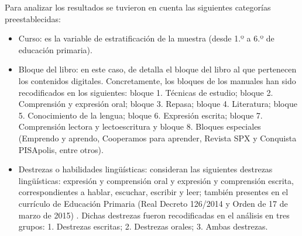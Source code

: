 \documentclass{textolivre}
\begin{document}
Para analizar los resultados se tuvieron en cuenta las siguientes categorías preestablecidas:  

\begin{itemize}
    \item Curso: es la variable de estratificación de la muestra (desde 1.º a 6.º de educación primaria).
    \item Bloque del libro: en este caso, de detalla el bloque del libro al que pertenecen los contenidos digitales. Concretamente, los bloques de los manuales han sido recodificados en los siguientes: bloque 1. Técnicas de estudio; bloque 2. Comprensión y expresión oral; bloque 3. Repasa; bloque 4. Literatura; bloque 5. Conocimiento de la lengua; bloque 6. Expresión escrita; bloque 7. Comprensión lectora y lectoescritura y bloque 8. Bloques especiales (Emprendo y aprendo, Cooperamos para aprender, Revista SPX y Conquista PISApolis, entre otros). 
    \item Destrezas o habilidades lingüísticas: \textcite{cassany_ensenar_1994} consideran las siguientes destrezas lingüísticas: expresión y comprensión oral y expresión y comprensión escrita, correspondientes a hablar, escuchar, escribir y leer; también presentes en el currículo de Educación Primaria (Real Decreto 126/2014 y Orden de 17 de marzo de 2015) \cite{ministerio_de_educacion_y_ciencia_real_2014, junta_de_andalucia_orden_2015}. Dichas destrezas fueron recodificadas en el análisis en tres grupos: 1. Destrezas escritas; 2. Destrezas orales; 3. Ambas destrezas.

\end{itemize}
\end{document}
